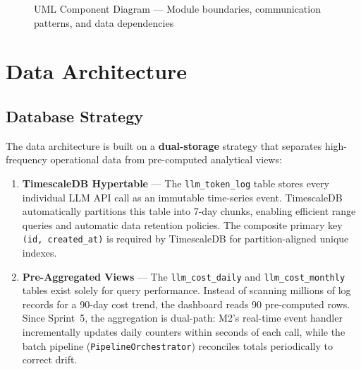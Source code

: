 \documentclass[12pt,a4paper,twoside]{report}
\begin{document}
\begin{figure}[H]
\caption{UML Component Diagram — Module boundaries, communication patterns, and data dependencies}
\label{fig:component}
\end{figure}



\chapter{Data Architecture}

\section{Database Strategy}

The data architecture is built on a \textbf{dual-storage} strategy that separates high-frequency operational data from pre-computed analytical views:

\begin{enumerate}
  \item \textbf{TimescaleDB Hypertable} — The \texttt{llm\_token\_log} table stores every individual LLM API call as an immutable time-series event. TimescaleDB automatically partitions this table into 7-day chunks, enabling efficient range queries and automatic data retention policies. The composite primary key \texttt{(id, created\_at)} is required by TimescaleDB for partition-aligned unique indexes.

  \item \textbf{Pre-Aggregated Views} — The \texttt{llm\_cost\_daily} and \texttt{llm\_cost\_monthly} tables exist solely for query performance. Instead of scanning millions of log records for a 90-day cost trend, the dashboard reads 90 pre-computed rows. Since Sprint~5, the aggregation is dual-path: M2's real-time event handler incrementally updates daily counters within seconds of each call, while the batch pipeline (\texttt{PipelineOrchestrator}) reconciles totals periodically to correct drift.
\end{enumerate}
\end{document}
